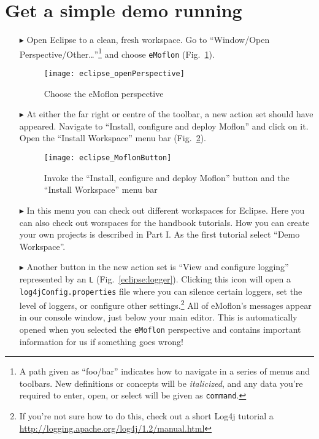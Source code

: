 \newpage
\genHeader

\section{Get a simple demo running}


\begin{itemize}
\hypertarget{simpleDemo common}{} 
\item[$\blacktriangleright$] Open Eclipse to a clean, fresh workspace. Go to ``Window/Open Perspective/Other\ldots''\footnote{A path given as ``foo/bar''
indicates how to navigate in a series of menus and toolbars. New definitions or concepts will be \emph{italicized}, and any data you're required to enter,
open, or select will be given as \texttt{command}.} and choose \texttt{eMoflon} (Fig.~\ref{eclipse:openPerspective}).

\begin{figure}[htbp]
	\centering
  \texttt{[image: eclipse\_openPerspective]}
	\caption{Choose the eMoflon perspective}
	\label{eclipse:openPerspective}
\end{figure} 

\item[$\blacktriangleright$] At either the far right or centre of the toolbar, a new action set should have appeared. Navigate to ``Install, configure and deploy Moflon'' and click on it. Open the  ``Install Workspace'' menu bar
(Fig.~\ref{eclipse:newMetamodel}).

\vspace{0.5cm}
\begin{figure}[htbp]
	\centering
  \texttt{[image: eclipse\_MoflonButton]}
	\caption{Invoke the ``Install, configure and deploy Moflon'' button and the ``Install Workspace'' menu bar}
	\label{eclipse:newMetamodel}
\end{figure}

\newpage

\item[$\blacktriangleright$] In this menu you can check out different workspaces for Eclipse. Here you can also check out worspaces for the handbook tutorials. How you can create your own projects is described in Part I. As the first tutorial select ``Demo Workspace''. 

\item[$\blacktriangleright$]  Another button in the new action set is ``View and configure logging'' represented by an \texttt{L} (Fig.~\ref{eclipse:logger}).
Clicking this icon will open a \texttt{log4jConfig.properties} file where you can silence certain loggers, set the level of loggers, or configure other
settings.\footnote{If you're not sure how to do this, check out a short Log4j tutorial a \url{http://logging.apache.org/log4j/1.2/manual.html}} All of eMoflon's
messages appear in our console window, just below your main editor. This is automatically opened when you selected the \texttt{eMoflon} perspective and
contains important information for us if something goes wrong!


\end{itemize}
